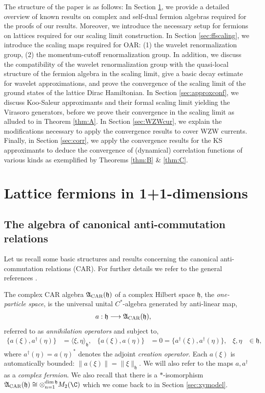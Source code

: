 \documentclass[a4paper, 11pt]{article}
\newcommand{\fA}{\mathfrak{A}}\newcommand{\cA}{\mathcal{A}}\newcommand{\dA}{\mathds{A}}\newcommand{\sA}{\mathscr{A}}
\newcommand{\fh}{\mathfrak{h}}
\DeclareMathOperator{\1}{\mathds{1}}
\DeclareMathOperator{\CAR}{\textup{CAR}}
\begin{document}
The structure of the paper is as follows: In Section \ref{sec:ffapprox}, we provide a detailed overview of known results on complex and self-dual fermion algebras required for the proofs of our results. Moreover, we introduce the necessary setup for fermions on lattices required for our scaling limit construction. In Section \ref{sec:ffscaling}, we introduce the scaling maps required for OAR: (1) the wavelet renormalization group, (2) the momentum-cutoff renormalization group. In addition, we discuss the compatibility of the wavelet renormalization group with the quasi-local structure of the fermion algebra in the scaling limit, give a basic decay estimate for wavelet approximations, and prove the convergence of the scaling limit of the ground states of the lattice Dirac Hamiltonian. In Section \ref{sec:approxconf}, we discuss Koo-Saleur approximants and their formal scaling limit yielding the Virasoro generators, before we prove their convergence in the scaling limit as alluded to in Theorem \ref{thm:A}. In Section \ref{sec:WZWcur}, we explain the modifications necessary to apply the convergence results to cover WZW currents. Finally, in Section \ref{sec:corr}, we apply the convergence results for the KS approximants to deduce the convergence of (dynamical) correlation functions of various kinds as exemplified by Theorems \ref{thm:B} \& \ref{thm:C}.

\section{Lattice fermions in 1+1-dimensions}
\label{sec:ffapprox}

\subsection{The algebra of canonical anti-commutation relations}
\label{sec:car}
Let us recall some basic structures and results concerning the canonical anti-commutation relations (CAR). For further details we refer to the general references \cite{EvansQuantumSymmetriesOn, BratteliOperatorAlgebrasAnd2}.

The complex CAR algebra $\fA_{\CAR}(\fh)$ of a complex Hilbert space $\fh$, the \textit{one-particle space}, is the universal unital $C^{*}$-algebra generated by anti-linear map,
\begin{align}
\label{eq:annihilation}
a : \fh & \longrightarrow \fA_{\CAR}(\fh),
\end{align}
referred to as \textit{annihilation operators} and subject to,
\begin{align}
\label{eq:car}
\{a(\xi),a^{\dag}(\eta)\} & = \langle\xi,\eta\rangle_{\fh}, & \{a(\xi),a(\eta)\} & = 0 = \{a^{\dag}(\xi),a^{\dag}(\eta)\}, & \xi,\eta & \in\fh,
\end{align}
where $a^{\dag}(\eta) = a(\eta)^{*}$ denotes the adjoint \textit{creation operator}. Each $a(\xi)$ is automatically bounded: $\|a(\xi)\|=\|\xi\|_{\fh}$. We will also refer to the maps $a, a^{\dag}$ as a \textit{complex fermion}. We also recall that there is a $*$-isomorphism $\fA_{\CAR}(\fh)\cong\otimes_{n=1}^{\dim\fh}M_{2}(\C)$ which we come back to in Section \ref{sec:xymodel}.
\end{document}
